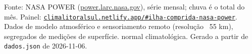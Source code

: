 \documentclass[10pt,a4paper]{article}
\begin{document}
\vspace{1pt}
{\tiny\color{cinza}
Fonte: NASA POWER (\href{https://power.larc.nasa.gov}{power.larc.nasa.gov}), série mensal;
chuva é o total do mês. Painel:
\href{https://climalitoralsul.netlify.app/\#ilha-comprida-nasa-power}%
{\texttt{climalitoralsul.netlify.app/\#ilha-comprida-nasa-power}}.
Dados de modelo atmosférico e sensoriamento remoto (resolução ~55 km), segregados de medições de superfície. 
normal climatológica.
Gerado a partir de \texttt{dados.json} de 2026-11-06.}
\end{document}
